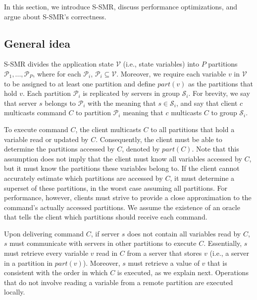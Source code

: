 \documentclass[10pt, conference, compsocconf, letterpaper]{IEEEtranv17}
\newcommand{\ppm}{\mathcal{P}}
\newcommand{\vvm}{\mathcal{V}}
\newcommand{\ssm}{\mathcal{S}}
\begin{document}
In this section, we introduce S-SMR, discuss performance optimizations, and argue about S-SMR's correctness.


\subsection{General idea}
\label{sec:generalidea}

S-SMR divides the application state $\vvm$ (i.e., state variables) into $P$ partitions $\ppm_1, ..., \ppm_P$, where for each $\ppm_i$, $\ppm_i \subseteq \vvm$. 
Moreover, we require each variable $v$ in $\vvm$ to be assigned to at least one partition and define $part(v)$ as the partitions that hold $v$. 
Each partition $\ppm_i$ is replicated by servers in group $\ssm_i$.
For brevity, we say that server $s$ belongs to $\ppm_i$ with the meaning that $s \in \ssm_i$, and say that client $c$ multicasts command $C$ to partition $\ppm_i$ meaning that $c$ multicasts $C$ to group $\ssm_i$.

To execute command $C$, the client multicasts $C$ to all partitions that hold a variable read or updated by $C$.
Consequently, the client must be able to determine the partitions accessed by $C$, denoted by $part(C)$.
Note that this assumption does not imply that the client must know all variables accessed by $C$, but it must know the partitions these variables belong to.
If the client cannot accurately estimate which partitions are accessed by $C$, it must determine a superset of these partitions, in the worst case assuming all partitions.
For performance, however, clients must strive to provide a close approximation to the command's actually accessed partitions. We assume the existence of an oracle that tells the client which partitions should receive each command.

Upon delivering command $C$, if server $s$ does not contain all variables read by $C$, $s$ must communicate with servers in other partitions to execute $C$. 
%
Essentially, $s$ must retrieve every variable $v$ read in $C$ from a server that stores $v$ (i.e., a server in a partition in $part(v)$).
Moreover, $s$ must retrieve a value of $v$ that is consistent with the order in which $C$ is executed, as we explain next.
Operations that do not involve reading a variable from a remote partition are executed locally.
\end{document}
